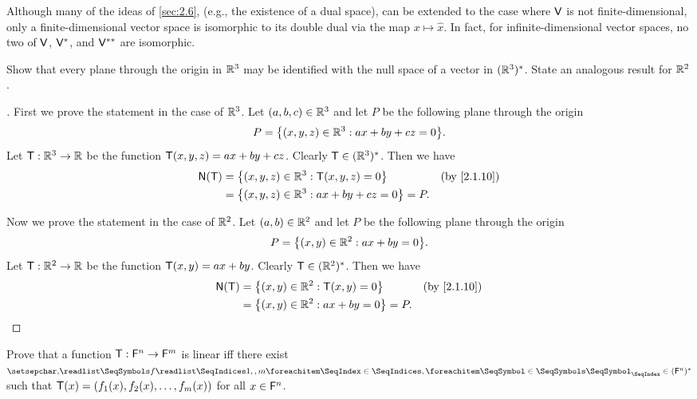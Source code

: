 \begin{note}
  Although many of the ideas of \cref{sec:2.6}, (e.g., the existence of a dual space), can be extended to the case where \(\mathsf{V}\) is not finite-dimensional, only a finite-dimensional vector space is isomorphic to its double dual via the map \(x \mapsto \widehat{x}\).
  In fact, for infinite-dimensional vector spaces, no two of \(\mathsf{V}\), \(\mathsf{V}^*\), and \(\mathsf{V}^{**}\) are isomorphic.
\end{note}

\exercisesection

\setcounter{ex}{7}
\begin{ex}\label{ex:2.6.8}
  Show that every plane through the origin in \(\mathbb{R}^3\) may be identified with the null space of a vector in \((\mathbb{R}^3)^*\).
  State an analogous result for \(\mathbb{R}^2\).
\end{ex}

\begin{proof}[]
  First we prove the statement in the case of \(\mathbb{R}^3\).
  Let \((a, b, c) \in \mathbb{R}^3\) and let \(P\) be the following plane through the origin
  \[
    P = \set{(x, y, z) \in \R^3 : ax + by + cz = 0}.
  \]
  Let \(\mathsf{T} : \mathbb{R}^3 \to \mathbb{R}\) be the function \(\mathsf{T}(x, y, z) = ax + by + cz\).
  Clearly \(\mathsf{T} \in (\mathbb{R}^3)^*\).
  Then we have
  \begin{align*}
    \ns{\T} & = \set{(x, y, z) \in \R^3 : \T(x, y, z) = 0}       &  & \text{(by \cref{2.1.10})} \\
            & = \set{(x, y, z) \in \R^3 : ax + by + cz = 0} = P.
  \end{align*}

  Now we prove the statement in the case of \(\mathbb{R}^2\).
  Let \((a, b) \in \mathbb{R}^2\) and let \(P\) be the following plane through the origin
  \[
    P = \set{(x, y) \in \R^2 : ax + by = 0}.
  \]
  Let \(\mathsf{T} : \mathbb{R}^2 \to \mathbb{R}\) be the function \(\mathsf{T}(x, y) = ax + by\).
  Clearly \(\mathsf{T} \in (\mathbb{R}^2)^*\).
  Then we have
  \begin{align*}
    \ns{\T} & = \set{(x, y) \in \R^2 : \T(x, y) = 0}     &  & \text{(by \cref{2.1.10})} \\
            & = \set{(x, y) \in \R^2 : ax + by = 0} = P.
  \end{align*}
\end{proof}

\begin{ex}\label{ex:2.6.9}
  Prove that a function \(\mathsf{T} : \mathsf{F}^n \to \mathsf{F}^m\) is linear iff there exist \(\seq{f}{1,,m} \in (\vs{F}^n)^*\) such that \(\mathsf{T}(x) = (f_1(x), f_2(x), \dots, f_m(x))\) for all \(x \in \mathsf{F}^n\).
\end{ex}

